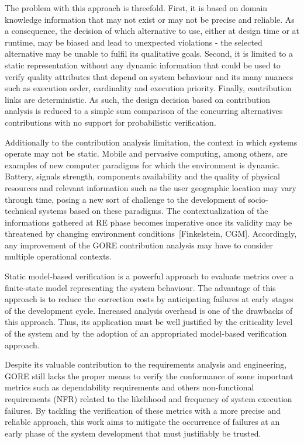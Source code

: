 The problem with this approach is threefold. First, it is based on domain knowledge information that may not exist or may not be precise and reliable. As a consequence, the decision of which alternative to use, either at design time or at runtime, may be biased and lead to unexpected violations - the selected alternative may be unable to fulfil its qualitative goals. Second, it is limited to a static representation without any dynamic information that could be used to verify quality attributes that depend on system behaviour and its many nuances such as execution order, cardinality and execution priority. Finally, contribution links are deterministic. As such, the design decision based on contribution analysis is reduced to a simple sum comparison of the concurring alternatives contributions with no support for probabilistic verification.

Additionally to the contribution analysis limitation, the context in which systems operate may not be static. Mobile and pervasive computing, among others, are examples of new computer paradigms for which the environment is dynamic. Battery, signals strength, components availability and the quality of physical resources and relevant information such as the user geographic location may vary through time, posing a new sort of challenge to the development of socio-technical systems based on these paradigms. The contextualization of the informations gathered at RE phase becomes imperative once its validity may be threatened by changing environment conditions~[Finkelstein, CGM]. Accordingly, any improvement of the GORE contribution analysis may have to consider multiple operational contexts.

Static model-based verification is a powerful approach to evaluate metrics over a finite-state model representing the system behaviour. The advantage of this approach is to reduce the correction costs by anticipating failures at early stages of the development cycle. Increased analysis overhead is one of the drawbacks of this approach. Thus, its application must be well justified by the criticality level of the system and by the adoption of an appropriated model-based verification approach.

Despite its valuable contribution to the requirements analysis and engineering, GORE still lacks the proper means to verify the conformance of some important metrics such as dependability requirements and others non-functional requirements (NFR) related to the likelihood and frequency of system execution failures. By tackling the verification of these metrics with a more precise and reliable approach, this work aims to mitigate the occurrence of failures at an early phase of the system development that must justifiably be trusted.

